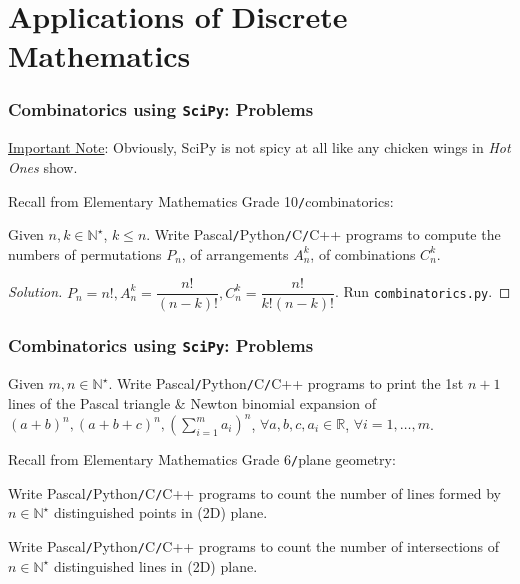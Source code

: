 \documentclass{beamer}
\begin{document}
\section{Applications of Discrete Mathematics}

\begin{frame}
	\frametitle{Combinatorics using {\tt SciPy}: Problems}
	\underline{Important Note}: Obviously, SciPy is not spicy at all like any chicken wings in {\it Hot Ones} show.
	
	Recall from Elementary Mathematics Grade 10{\tt/}combinatorics:
	
	\begin{problem}
		Given $n,k\in\mathbb{N}^\star$, $k\le n$. Write {\sf Pascal{\tt/}Python{\tt/}C{\tt/}C++} programs to compute the numbers of permutations $P_n$, of arrangements $A_n^k$, of combinations $C_n^k$.
	\end{problem}
	
	\begin{proof}[Solution]
		$P_n = n!,A_n^k = \dfrac{n!}{(n - k)!},C_n^k = \dfrac{n!}{k!(n - k)!}$. Run {\tt combinatorics.py}.		
	\end{proof}
\end{frame}

\begin{frame}
	\frametitle{Combinatorics using {\tt SciPy}: Problems}
	
	\begin{problem}
		Given $m,n\in\mathbb{N}^\star$. Write {\sf Pascal{\tt/}Python{\tt/}C{\tt/}C++} programs to print the 1st $n + 1$ lines of the Pascal triangle \& Newton binomial expansion of $(a + b)^n,(a + b + c)^n,\left(\sum_{i=1}^m a_i\right)^n$,  $\forall a,b,c,a_i\in\mathbb{R}$, $\forall i = 1,\ldots,m$.
	\end{problem}
	Recall from Elementary Mathematics Grade 6{\tt/}plane geometry:
	
	\begin{problem}
		Write {\sf Pascal{\tt/}Python{\tt/}C{\tt/}C++} programs to count the number of lines formed by $n\in\mathbb{N}^\star$ distinguished points in (2D) plane.
	\end{problem}
	
	\begin{problem}
		Write {\sf Pascal{\tt/}Python{\tt/}C{\tt/}C++} programs to count the number of intersections of $n\in\mathbb{N}^\star$ distinguished lines in (2D) plane.
	\end{problem}
\end{frame}
\end{document}
